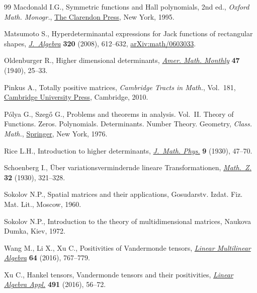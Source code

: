 \documentclass[10pt,a4paper]{amsart}
\numberwithin{equation}{section}
\begin{document}
\begin{thebibliography}{99}
Macdonald I.G., Symmetric functions and {H}all polynomials, 2nd ed., \textit{Oxford
 Math. Monogr.}, \href{https://doi.org/10.1093/oso/9780198534891.001.0001}{The
 Clarendon Press}, New York, 1995.

Matsumoto S., Hyperdeterminantal expressions for {J}ack functions of
 rectangular shapes,
 \href{https://doi.org/10.1016/j.jalgebra.2007.09.013}{\textit{J.~Algebra}}
 \textbf{320} (2008), 612--632,
 \href{http://arxiv.org/abs/math/0603033}{arXiv:math/0603033}.

Oldenburger R., Higher dimensional determinants,
 \href{https://doi.org/10.2307/2304053}{\textit{Amer. Math. Monthly}}
 \textbf{47} (1940), 25--33.

Pinkus A., Totally positive matrices, \textit{Cambridge Tracts in Math.}, Vol.~181, \href{https://doi.org/10.1017/CBO9780511691713}{Cambridge University
 Press}, Cambridge, 2010.

P\'olya G., Szeg\H{o} G., Problems and theorems in analysis. {V}ol.~{II}.
 Theory of Functions. Zeros. Polynomials. Determinants. Number Theory.
 Geometry, \textit{Class. Math.},
 \href{https://doi.org/10.1007/978-3-642-61905-2}{Springer}, New York, 1976.

Rice L.H., Introduction to higher determinants,
 \href{https://doi.org/10.1002/sapm19309147}{\textit{J.~Math. Phys.}}
 \textbf{9} (1930), 47--70.

Schoenberg I., \"Uber variationsvermindernde lineare {T}ransformationen,
 \href{https://doi.org/10.1007/BF01194637}{\textit{Math.~Z.}} \textbf{32}
 (1930), 321--328.

Sokolov N.P., Spatial matrices and their applications, Gosudarstv. Izdat. Fiz.
 Mat. Lit., Moscow, 1960.

Sokolov N.P., Introduction to the theory of multidimensional matrices, Naukova
 Dumka, Kiev, 1972.

Wang M., Li X., Xu C., Positivities of {V}andermonde tensors,
 \href{https://doi.org/10.1080/03081087.2015.1122722}{\textit{Linear
 Multilinear Algebra}} \textbf{64} (2016), 767--779.

Xu C., Hankel tensors, {V}andermonde tensors and their positivities,
 \href{https://doi.org/10.1016/j.laa.2015.02.012}{\textit{Linear Algebra
 Appl.}} \textbf{491} (2016), 56--72.

\end{thebibliography}
\end{document}
